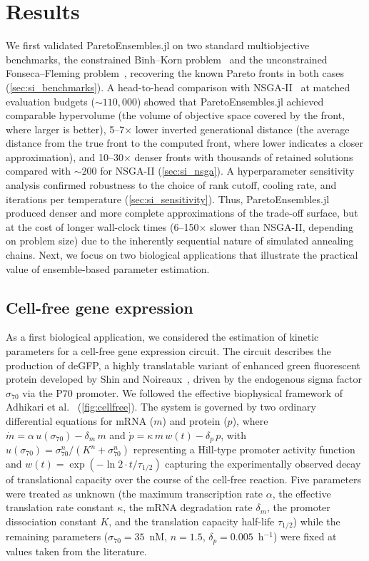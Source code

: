 \documentclass[preprint,review,12pt]{elsarticle}
\begin{document}
\section{Results}\label{sec:results}
We first validated ParetoEnsembles.jl on two standard multiobjective benchmarks, the constrained Binh--Korn problem~\cite{Binh1997} and the unconstrained Fonseca--Fleming problem~\cite{Fonseca1995}, recovering the known Pareto fronts in both cases (\cref{sec:si_benchmarks}). A head-to-head comparison with NSGA-II~\cite{Deb2002} at matched evaluation budgets (${\sim}110{,}000$) showed that ParetoEnsembles.jl achieved comparable hypervolume (the volume of objective space covered by the front, where larger is better), 5--7$\times$ lower inverted generational distance (the average distance from the true front to the computed front, where lower indicates a closer approximation), and 10--30$\times$ denser fronts with thousands of retained solutions compared with ${\sim}200$ for NSGA-II (\cref{sec:si_nsga}).
A hyperparameter sensitivity analysis confirmed robustness to the choice of rank cutoff, cooling rate, and iterations per temperature (\cref{sec:si_sensitivity}). Thus, ParetoEnsembles.jl produced denser and more complete approximations of the trade-off surface, but at the cost of longer wall-clock times (6--150$\times$ slower than NSGA-II, depending on problem size) due to the inherently sequential nature of simulated annealing chains. Next, we focus on two biological applications that illustrate the practical value of ensemble-based parameter estimation.

\subsection{Cell-free gene expression}\label{sec:cellfree}
As a first biological application, we considered the estimation of kinetic parameters for a cell-free gene expression circuit. The circuit describes the production of deGFP, a highly translatable variant of enhanced green fluorescent protein developed by Shin and Noireaux~\cite{Shin2010}, driven by the endogenous sigma factor $\sigma_{70}$ via the P70 promoter. We followed the effective biophysical framework of Adhikari et al.~\cite{Adhikari2020} (\cref{fig:cellfree}). The system is governed by two ordinary differential equations for mRNA ($m$) and protein ($p$), where $\dot{m} = \alpha\, u(\sigma_{70}) - \delta_m\, m$ and $\dot{p} = \kappa\, m\, w(t) - \delta_p\, p$, with $u(\sigma_{70}) = \sigma_{70}^{n}/(K^n + \sigma_{70}^n)$ representing a Hill-type promoter activity function and $w(t) = \exp(-\ln 2 \cdot t / \tau_{1/2})$ capturing the experimentally observed decay of translational capacity over the course of the cell-free reaction. Five parameters were treated as unknown (the maximum transcription rate $\alpha$, the effective translation rate constant $\kappa$, the mRNA degradation rate $\delta_m$, the promoter dissociation constant $K$, and the translation capacity half-life $\tau_{1/2}$) while the remaining parameters ($\sigma_{70} = 35$~nM, $n = 1.5$, $\delta_p = 0.005$~h$^{-1}$) were fixed at values taken from the literature.
\end{document}
